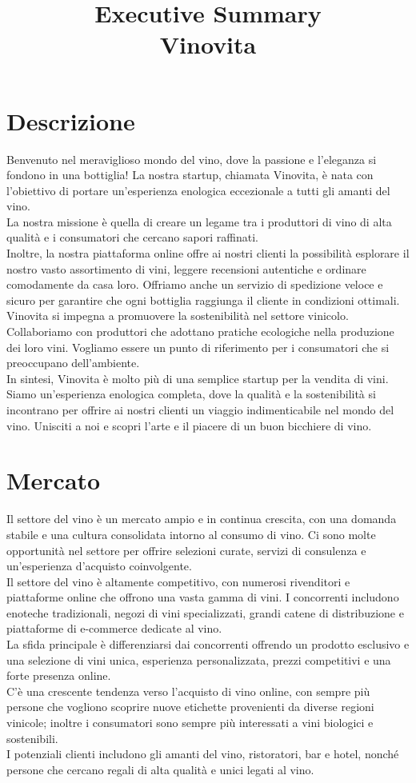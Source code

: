 \documentclass[12pt, a4paper]{article}
\title{\textbf{Executive Summary}\\Vinovita}
\date{}
\author{}
\newcommand{\meskip}{\medskip \\}
\begin{document}
\maketitle

\section*{Descrizione}
Benvenuto nel meraviglioso mondo del vino, dove la passione e l'eleganza si fondono in una bottiglia! La nostra startup, chiamata Vinovita, è nata con l'obiettivo di portare un'esperienza enologica eccezionale a tutti gli amanti del vino. \meskip
La nostra missione è quella di creare un legame tra i produttori di vino di alta qualità e i consumatori che cercano sapori raffinati.\meskip
Inoltre, la nostra piattaforma online offre ai nostri clienti la possibilità esplorare il nostro vasto assortimento di vini, leggere recensioni autentiche e ordinare comodamente da casa loro.
Offriamo anche un servizio di spedizione veloce e sicuro per garantire che ogni bottiglia raggiunga il cliente in condizioni ottimali.\meskip
Vinovita si impegna a promuovere la sostenibilità nel settore vinicolo.
Collaboriamo con produttori che adottano pratiche ecologiche nella produzione dei loro vini.
Vogliamo essere un punto di riferimento per i consumatori che si preoccupano dell'ambiente.\meskip
In sintesi, Vinovita è molto più di una semplice startup per la vendita di vini.
Siamo un'esperienza enologica completa, dove la qualità e la sostenibilità si incontrano per offrire ai nostri clienti un viaggio indimenticabile nel mondo del vino.
Unisciti a noi e scopri l'arte e il piacere di un buon bicchiere di vino.

\section*{Mercato}
Il settore del vino è un mercato ampio e in continua crescita, con una domanda stabile e una cultura consolidata intorno al consumo di vino.
Ci sono molte opportunità nel settore per offrire selezioni curate, servizi di consulenza e un'esperienza d'acquisto coinvolgente.\meskip
Il settore del vino è altamente competitivo, con numerosi rivenditori e piattaforme online che offrono una vasta gamma di vini.
I concorrenti includono enoteche tradizionali, negozi di vini specializzati, grandi catene di distribuzione e piattaforme di e-commerce dedicate al vino.\meskip
La sfida principale è differenziarsi dai concorrenti offrendo un prodotto esclusivo e una selezione di vini unica, esperienza personalizzata, prezzi competitivi e una forte presenza online.\meskip
C'è una crescente tendenza verso l'acquisto di vino online, con sempre più persone che vogliono scoprire nuove etichette provenienti da diverse regioni vinicole; inoltre i consumatori sono sempre più interessati a vini biologici e sostenibili.\meskip
I potenziali clienti includono gli amanti del vino, ristoratori, bar e hotel, nonché persone che cercano regali di alta qualità e unici legati al vino.
\end{document}
